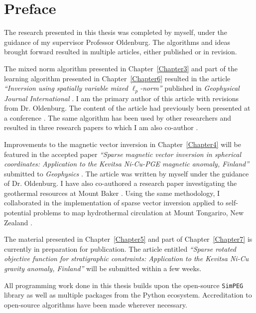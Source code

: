 
\chapter{Preface}
The research presented in this thesis was completed by myself, under the guidance of my supervisor Professor Oldenburg.
The algorithms and ideas brought forward resulted in multiple articles, either published or in revision. 
  
The mixed norm algorithm presented in Chapter~\ref{Chapter3} and part of the learning algorithm presented in Chapter~\ref{Chapter6} resulted in the article \emph{``Inversion using spatially variable mixed $\ell_p$-norm''} published in \emph{Geophysical Journal International} \cite[]{FournierDWO2019}. I am the primary author of this article with revisions from Dr. Oldenburg. The content of the article had previously been presented at a conference \cite[]{FournierDavis2016a}.
The same algorithm has been used by other researchers and resulted in three research papers to which I am also co-author \cite[]{Miller2017, Abedi2018, Abedi2018a}.

Improvements to the magnetic vector inversion in Chapter~\ref{Chapter4} will be featured in the accepted paper \emph{``Sparse magnetic vector inversion in spherical coordinates: Application to the Kevitsa Ni-Cu-PGE magnetic anomaly, Finland''} submitted to \emph{Geophysics} \cite[]{FournierDWO2019}. The article was written by myself under the guidance of Dr. Oldenburg.  I have also co-authored a research paper investigating the geothermal resources at Mount Baker \cite[]{Schermerhorn2017}.
Using the same methodology, I collaborated in the implementation of sparse vector inversion applied to self-potential problems to map hydrothermal circulation at Mount Tongariro, New Zealand \cite[]{Miller2018}. 

The material presented in Chapter~\ref{Chapter5} and part of Chapter~\ref{Chapter7} is currently in preparation for publication. The article entitled \emph{``Sparse rotated objective function for stratigraphic constraints: Application to the Kevitsa Ni-Cu gravity anomaly, Finland''} will be submitted within a few weeks.

All programming work done in this thesis builds upon the open-source \texttt{SimPEG} library as well as multiple packages from the Python ecosystem. Accreditation to open-source algorithms have been made wherever necessary.